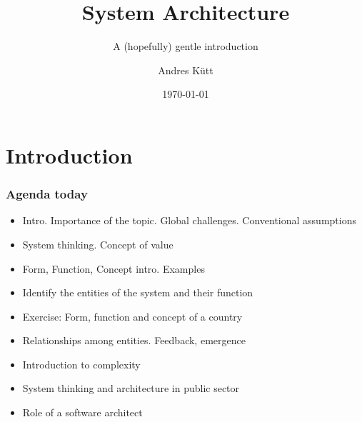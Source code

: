 \documentclass[10pt, compress]{beamer}
\title{System Architecture}
\subtitle{A (hopefully) gentle introduction}
\date{\today}
\author{Andres Kütt}
\institute{Riigi Infosüsteemi Amet}
\begin{document}
\maketitle

\section{Introduction}
\begin{frame}[fragile]
  \frametitle{Agenda today}
\begin{itemize}
	\item Intro. Importance of the topic. Global challenges. Conventional assumptions
	\item System thinking. Concept of value
	\item Form, Function, Concept intro. Examples
	\item Identify the entities of the system and their function
	\item Exercise: Form, function and concept of a country
	\item Relationships among entities. Feedback, emergence
	\item Introduction to complexity
	\item System thinking and architecture in public sector
	\item Role of a software architect
\end{itemize}
	
\end{frame}
\end{document}
